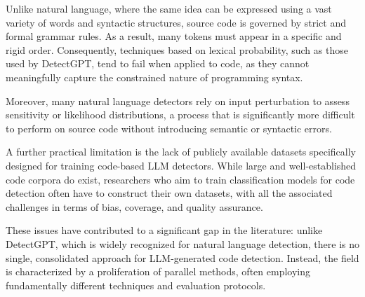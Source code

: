 Unlike natural language, where the same idea 
can be expressed using a vast variety of words 
and syntactic structures, source code is governed 
by strict and formal grammar rules. As a result, 
many tokens must appear in a specific and rigid 
order. Consequently, techniques based on lexical 
probability, such as those used by DetectGPT, 
tend to fail when applied to code, as they cannot 
meaningfully capture the constrained nature of 
programming syntax.

Moreover, many natural language detectors 
rely on input perturbation to assess sensitivity 
or likelihood distributions, a process that is 
significantly more difficult to perform on source 
code without introducing semantic or syntactic errors.

A further practical limitation is the lack of 
publicly available datasets specifically designed 
for training code-based LLM detectors. While large 
and well-established code corpora do exist, 
researchers who aim to train classification models 
for code detection often have to construct their 
own datasets, with all the associated challenges 
in terms of bias, coverage, and quality assurance.

These issues have contributed to a significant 
gap in the literature: unlike DetectGPT, which is 
widely recognized for natural language detection, 
there is no single, consolidated approach for 
LLM-generated code detection. Instead, the field 
is characterized by a proliferation of parallel 
methods, often employing fundamentally different 
techniques and evaluation protocols.
